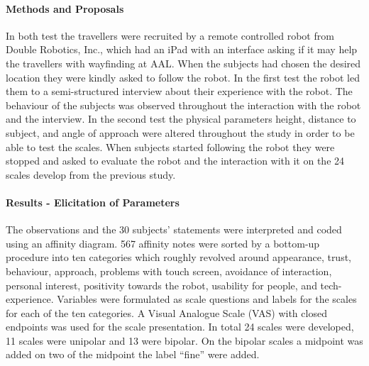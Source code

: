 \documentclass[a4paper]{article}
\begin{document}
\paragraph{Methods and Proposals}
%
In both test the travellers were recruited by a remote controlled robot from Double Robotics, Inc., which had an iPad with an interface asking if it may help the travellers with wayfinding at AAL. When the subjects had chosen the desired location they were kindly asked to follow the robot. In the first test the robot led them to a semi-structured interview about their experience with the robot. The behaviour of the subjects was observed throughout the interaction with the robot and the interview. In the second test the physical parameters height, distance to subject, and angle of approach were altered throughout the study in order to be able to test the scales. When subjects started following the robot they were stopped and asked to evaluate the robot and the interaction with it on the 24 scales develop from the previous study. 

\paragraph{Results - Elicitation of Parameters}
The observations and the 30 subjects' statements were interpreted and coded using an affinity diagram. 567 affinity notes were sorted by a bottom-up procedure into ten categories which roughly revolved around appearance, trust, behaviour, approach, problems with touch screen, avoidance of interaction, personal interest, positivity towards the robot, usability for people, and tech-experience. Variables were formulated as scale questions and labels for the scales for each of the ten categories. A Visual Analogue Scale (VAS) with closed endpoints was used for the scale presentation. In total 24 scales were developed, 
11 scales were unipolar and 13 were bipolar. On the bipolar scales a midpoint was added on two of the midpoint the label ``fine'' were added.  
\end{document}
